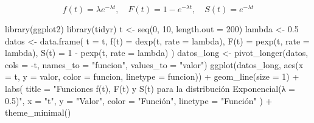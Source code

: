 \documentclass[
  letterpaper,
  ignorenonframetext,
  DIV=11,
  numbers=noendperiod]{scrartcl}
\newenvironment{Shaded}{\begin{snugshade}}{\end{snugshade}}
\newcommand{\AttributeTok}[1]{\textcolor[rgb]{0.40,0.45,0.13}{#1}}
\newcommand{\DecValTok}[1]{\textcolor[rgb]{0.68,0.00,0.00}{#1}}
\newcommand{\FloatTok}[1]{\textcolor[rgb]{0.68,0.00,0.00}{#1}}
\newcommand{\FunctionTok}[1]{\textcolor[rgb]{0.28,0.35,0.67}{#1}}
\newcommand{\NormalTok}[1]{\textcolor[rgb]{0.00,0.23,0.31}{#1}}
\newcommand{\OtherTok}[1]{\textcolor[rgb]{0.00,0.23,0.31}{#1}}
\newcommand{\SpecialCharTok}[1]{\textcolor[rgb]{0.37,0.37,0.37}{#1}}
\newcommand{\StringTok}[1]{\textcolor[rgb]{0.13,0.47,0.30}{#1}}
\begin{document}
\[
f(t) = \lambda e^{-\lambda t}, \quad F(t)=1-e^{-\lambda t}, \quad S(t) = e^{-\lambda t}
\]

\begin{Shaded}
\begin{Highlighting}[]
\FunctionTok{library}\NormalTok{(ggplot2)}
\FunctionTok{library}\NormalTok{(tidyr)}
\NormalTok{t }\OtherTok{\textless{}{-}} \FunctionTok{seq}\NormalTok{(}\DecValTok{0}\NormalTok{, }\DecValTok{10}\NormalTok{, }\AttributeTok{length.out =} \DecValTok{200}\NormalTok{)}
\NormalTok{lambda }\OtherTok{\textless{}{-}} \FloatTok{0.5}
\NormalTok{datos }\OtherTok{\textless{}{-}} \FunctionTok{data.frame}\NormalTok{(}
  \AttributeTok{t =}\NormalTok{ t,}
  \StringTok{\textasciigrave{}}\AttributeTok{f(t)}\StringTok{\textasciigrave{}} \OtherTok{=} \FunctionTok{dexp}\NormalTok{(t, }\AttributeTok{rate =}\NormalTok{ lambda),}
  \StringTok{\textasciigrave{}}\AttributeTok{F(t)}\StringTok{\textasciigrave{}} \OtherTok{=} \FunctionTok{pexp}\NormalTok{(t, }\AttributeTok{rate =}\NormalTok{ lambda),}
  \StringTok{\textasciigrave{}}\AttributeTok{S(t)}\StringTok{\textasciigrave{}} \OtherTok{=} \DecValTok{1} \SpecialCharTok{{-}} \FunctionTok{pexp}\NormalTok{(t, }\AttributeTok{rate =}\NormalTok{ lambda)}
\NormalTok{)}
\NormalTok{datos\_long }\OtherTok{\textless{}{-}} \FunctionTok{pivot\_longer}\NormalTok{(datos, }\AttributeTok{cols =} \SpecialCharTok{{-}}\NormalTok{t, }\AttributeTok{names\_to =} \StringTok{"funcion"}\NormalTok{, }\AttributeTok{values\_to =} \StringTok{"valor"}\NormalTok{)}
\FunctionTok{ggplot}\NormalTok{(datos\_long, }\FunctionTok{aes}\NormalTok{(}\AttributeTok{x =}\NormalTok{ t, }\AttributeTok{y =}\NormalTok{ valor, }\AttributeTok{color =}\NormalTok{ funcion, }\AttributeTok{linetype =}\NormalTok{ funcion)) }\SpecialCharTok{+}
  \FunctionTok{geom\_line}\NormalTok{(}\AttributeTok{size =} \DecValTok{1}\NormalTok{) }\SpecialCharTok{+}
  \FunctionTok{labs}\NormalTok{(}
    \AttributeTok{title =} \StringTok{"Funciones f(t), F(t) y S(t) para la distribución Exponencial(λ = 0.5)"}\NormalTok{,}
    \AttributeTok{x =} \StringTok{"t"}\NormalTok{,}
    \AttributeTok{y =} \StringTok{"Valor"}\NormalTok{,}
    \AttributeTok{color =} \StringTok{"Función"}\NormalTok{,}
    \AttributeTok{linetype =} \StringTok{"Función"}
\NormalTok{  ) }\SpecialCharTok{+}
  \FunctionTok{theme\_minimal}\NormalTok{()}
\end{Highlighting}
\end{Shaded}
\end{document}
